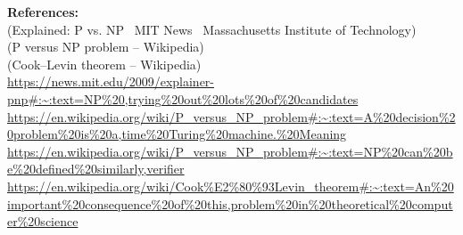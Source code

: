 \documentclass[11pt]{article}
\begin{document}
\bigskip

\noindent\textbf{References:} \\
(Explained: P vs. NP \textbar\ MIT News \textbar\ Massachusetts Institute of Technology) \\
(P versus NP problem -- Wikipedia) \\
(Cook--Levin theorem -- Wikipedia) \\
\url{https://news.mit.edu/2009/explainer-pnp#:~:text=NP%20,trying%20out%20lots%20of%20candidates} \\
\url{https://en.wikipedia.org/wiki/P_versus_NP_problem#:~:text=A%20decision%20problem%20is%20a,time%20Turing%20machine.%20Meaning} \\
\url{https://en.wikipedia.org/wiki/P_versus_NP_problem#:~:text=NP%20can%20be%20defined%20similarly,verifier} \\
\url{https://en.wikipedia.org/wiki/Cook%E2%80%93Levin_theorem#:~:text=An%20important%20consequence%20of%20this,problem%20in%20theoretical%20computer%20science}
\end{document}
